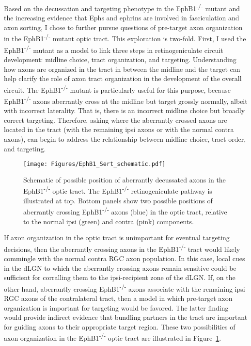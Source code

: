 \label{sec:BundleWidth}
Based on the decussation and targeting phenotype in the EphB1\textsuperscript{-/-} mutant and the increasing evidence that Ephs and ephrins are involved in fasciculation and axon sorting, I chose to further pursue questions of pre-target axon organization in the EphB1\textsuperscript{-/-} mutant optic tract.
This exploration is two-fold.
First, I used the EphB1\textsuperscript{-/-} mutant as a model to link three steps in retinogeniculate circuit development: midline choice, tract organization, and targeting.
Understanding how axons are organized in the tract in between the midline and the target can help clarify the role of axon tract organization in the development of the overall circuit.
The EphB1\textsuperscript{-/-} mutant is particularly useful for this purpose, because EphB1\textsuperscript{-/-} axons aberrantly cross at the midline but target grossly normally, albeit with incorrect laterality.
That is, there is an incorrect midline choice but broadly correct targeting.
Therefore, asking where the aberrantly crossed axons are located in the tract (with the remaining ipsi axons or with the normal contra axons), can begin to address the relationship between midline choice, tract order, and targeting.
\begin{figure}[hbtp]
    \begin{center}
        \texttt{[image: Figures/EphB1\_Sert\_schematic.pdf]}
        \caption[Schematic of possible position of aberrantly decussated axons in the EphB1\textsuperscript{-/-} optic tract.]
        {Schematic of possible position of aberrantly decussated axons in the EphB1\textsuperscript{-/-} optic tract.
        The EphB1\textsuperscript{-/-} retinogeniculate pathway is illustrated at top.
        Bottom panels show two possible positions of aberrantly crossing EphB1\textsuperscript{-/-} axons (blue) in the optic tract, relative to the normal ipsi (green) and contra (pink) components.
        }
        \label{EphB1Sertschematic}
    \end{center}
\end{figure}

If axon organization in the optic tract is unimportant for eventual targeting decisions, then the aberrantly crossing axons in the EphB1\textsuperscript{-/-} tract would likely commingle with the normal contra RGC axon population.
In this case, local cues in the dLGN to which the aberrantly crossing axons remain sensitive could be sufficient for corralling them to the ipsi-recipient zone of the dLGN.
If, on the other hand, aberrantly crossing EphB1\textsuperscript{-/-} axons associate with the remaining ipsi RGC axons of the contralateral tract, then a model in which pre-target axon organization is important for targeting would be favored.
The latter finding would provide indirect evidence that bundling partners in the tract are important for guiding axons to their appropriate target region.
These two possibilities of axon organization in the EphB1\textsuperscript{-/-} optic tract are illustrated in Figure~\ref{EphB1Sertschematic}.

